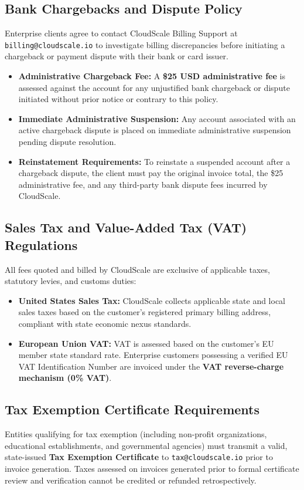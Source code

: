 \documentclass[10pt,letterpaper]{article}
\begin{document}
\subsection{Bank Chargebacks and Dispute Policy}
Enterprise clients agree to contact CloudScale Billing Support at \texttt{billing@cloudscale.io} to investigate billing discrepancies before initiating a chargeback or payment dispute with their bank or card issuer.
\begin{itemize}
  \item \textbf{Administrative Chargeback Fee:} A \textbf{\$25 USD administrative fee} is assessed against the account for any unjustified bank chargeback or dispute initiated without prior notice or contrary to this policy.
  \item \textbf{Immediate Administrative Suspension:} Any account associated with an active chargeback dispute is placed on immediate administrative suspension pending dispute resolution.
  \item \textbf{Reinstatement Requirements:} To reinstate a suspended account after a chargeback dispute, the client must pay the original invoice total, the \$25 administrative fee, and any third-party bank dispute fees incurred by CloudScale.
\end{itemize}

\subsection{Sales Tax and Value-Added Tax (VAT) Regulations}
All fees quoted and billed by CloudScale are exclusive of applicable taxes, statutory levies, and customs duties:
\begin{itemize}
  \item \textbf{United States Sales Tax:} CloudScale collects applicable state and local sales taxes based on the customer's registered primary billing address, compliant with state economic nexus standards.
  \item \textbf{European Union VAT:} VAT is assessed based on the customer's EU member state standard rate. Enterprise customers possessing a verified EU VAT Identification Number are invoiced under the \textbf{VAT reverse-charge mechanism (0\% VAT)}.
\end{itemize}

\subsection{Tax Exemption Certificate Requirements}
Entities qualifying for tax exemption (including non-profit organizations, educational establishments, and governmental agencies) must transmit a valid, state-issued \textbf{Tax Exemption Certificate} to \texttt{tax@cloudscale.io} prior to invoice generation. Taxes assessed on invoices generated prior to formal certificate review and verification cannot be credited or refunded retrospectively.
\end{document}
